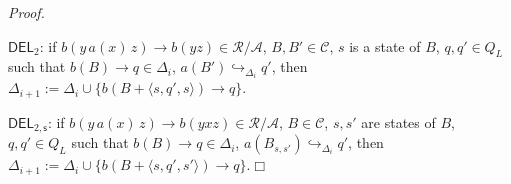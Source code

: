\documentclass[a4paper]{article}
\theoremstyle{plain}
\newcommand{\qed}{\hfill $\Box$}
\newenvironment{proof}{\noindent\emph{Proof.}}{}
\newcommand{\R}{\mathcal{R}}
\newcommand{\A}{\mathcal{A}}
\newcommand{\C}{\mathcal{C}}
\newcommand{\ptrs}[2]{{#1}{/}{#2}}
\newcommand{\DEL}{\mathsf{DEL}}
\begin{document}
\begin{proof}
\begin{description}
\item{$\DEL_2$:} 
if $b(y\,a(x)\,z) \to b(yz) \in \ptrs{\R}{\A}$,
$B, B' \in \C$, $s$ is a state of $B$,
$q, q' \in Q_L$ 
such that 
$b(B) \to q \in \Delta_i$,
$a(B') \hookrightarrow_{\Delta_i} q'$,
then 
$\Delta_{i+1} := \Delta_i \cup \bigl\{ b(B + \langle s,q',s\rangle) \to q \bigr\}$.

\item{$\DEL_{2,\mathsf{s}}$:}
if $b(y\,a(x)\,z) \to b(yxz) \in \ptrs{\R}{\A}$,
$B \in \C$, $s, s'$ are states of $B$,
$q, q' \in Q_L$ 
such that 
$b(B) \to q \in \Delta_i$,
$a(B_{s,s'}) \hookrightarrow_{\Delta_i} q'$,
then 
$\Delta_{i+1} := \Delta_i \cup \bigl\{ b(B + \langle s,q',s'\rangle) \to q \bigr\}$.\qed
\end{description}
\end{proof}
\end{document}
